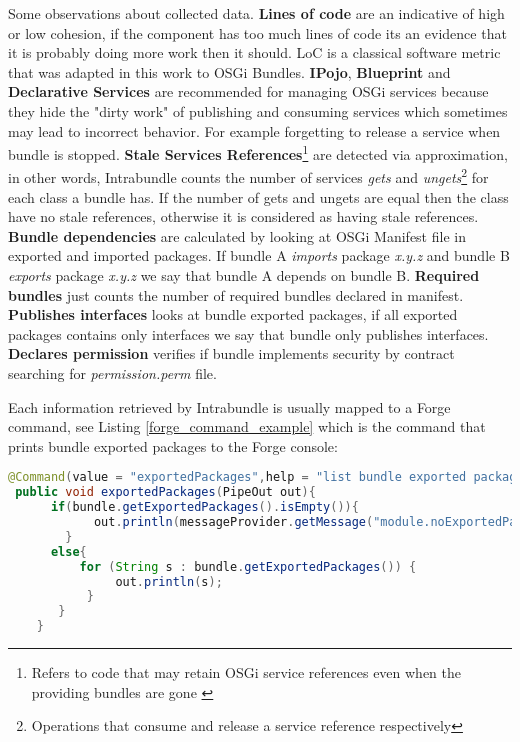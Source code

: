 Some observations about collected data. \textbf{Lines of code} are an indicative of high or low cohesion, if the component has too much lines of code its an evidence that it is probably doing more work then it should. LoC is a classical software metric that was adapted in this work to OSGi Bundles. 
\textbf{IPojo}, \textbf{Blueprint} and \textbf{Declarative Services} are recommended for managing OSGi services because they hide the "dirty work" of publishing and consuming services which sometimes may lead to incorrect behavior. For example forgetting to release a service when bundle is stopped.  
\textbf{Stale Services References}\footnote{Refers to code that may retain OSGi service references even when the providing bundles are gone \citep{Gama 2012}} are detected via approximation, in other words, Intrabundle counts the number of services \emph{gets} and \emph{ungets}\footnote{Operations that consume and release a service reference respectively} for each class a bundle has. If the number of gets and ungets are equal then the class have no stale references, otherwise it is considered as having stale references.
\textbf{Bundle dependencies} are calculated by looking at OSGi Manifest file in exported and imported packages. If bundle A \emph{imports} package \emph{x.y.z} and bundle B \emph{exports} package \emph{x.y.z} we say that bundle A depends on bundle B. 
\textbf{Required bundles} just counts the number of required bundles declared in manifest.
\textbf{Publishes interfaces} looks at bundle exported packages, if all exported packages contains only interfaces we say that bundle only publishes interfaces.
\textbf{Declares permission} verifies if bundle implements security by contract searching for \emph{permission.perm} file.

Each information retrieved by Intrabundle is usually mapped to a Forge command, see Listing \ref{forge_command_example} which is the command that prints bundle exported packages to the Forge console:
\pagebreak
\begin{lstlisting}[language=java,label=forge_command_example,caption=Exported packages command]
 @Command(value = "exportedPackages",help = "list bundle exported packages")
 public void exportedPackages(PipeOut out){
      if(bundle.getExportedPackages().isEmpty()){
            out.println(messageProvider.getMessage("module.noExportedPackages"));
        }
      else{
          for (String s : bundle.getExportedPackages()) {
               out.println(s);
           }
       }
    }
\end{lstlisting}
\FloatBarrier

